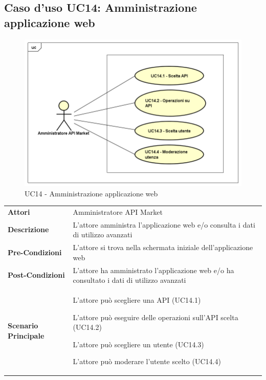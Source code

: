 \newpage
\subsection{Caso d'uso UC14: Amministrazione applicazione web}
\label{UC14}
\begin{figure}[ht]
	\centering
	\includegraphics[scale=0.45]{UML/UC14.png}
	\caption{UC14 - Amministrazione applicazione web}
\end{figure}

\begin{longtable}{ l | p{11cm}}
	\hline
	\rowcolor{Gray}
	\multicolumn{2}{c}{UC14: Amministrazione applicazione web} \\
	\hline
	\textbf{Attori} & Amministratore API Market \\
	\textbf{Descrizione} & L'attore amministra l'applicazione web e/o consulta i dati di utilizzo avanzati \\
	\textbf{Pre-Condizioni} & L'attore si trova nella schermata iniziale dell'applicazione web \\
	\textbf{Post-Condizioni} & L'attore ha amministrato l'applicazione web e/o ha consultato i dati di utilizzo avanzati \\
	\textbf{Scenario Principale} & 
	\begin{enumerate*}[label=(\arabic*.),itemjoin={\newline}]
		\item L'attore può scegliere una API (UC14.1)
		\item L'attore può eseguire delle operazioni sull'API scelta (UC14.2)
		\item L'attore può scegliere un utente (UC14.3)
		\item L'attore può moderare l'utente scelto (UC14.4)
	\end{enumerate*}\\
\end{longtable}

